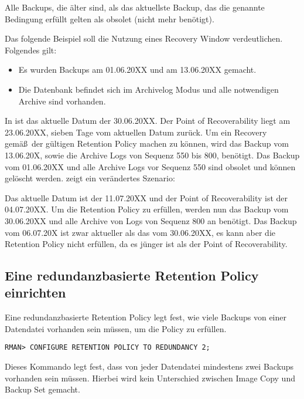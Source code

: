         Alle Backups, die älter sind, als das aktuellste Backup, das die genannte Bedingung erfüllt gelten als obsolet (nicht mehr benötigt).

        Das folgende Beispiel soll die Nutzung eines Recovery Window verdeutlichen. Folgendes gilt:
        \begin{itemize}
          \item Es wurden Backups am 01.06.20XX und am 13.06.20XX gemacht.
          \item Die Datenbank befindet sich im Archivelog Modus und alle notwendigen Archive sind vorhanden.
        \end{itemize}
        In  ist das aktuelle Datum der 30.06.20XX. Der Point of Recoverability liegt am 23.06.20XX, sieben Tage vom aktuellen Datum zurück. Um ein Recovery gemäß\ der gültigen Retention Policy machen zu können, wird das Backup vom 13.06.20X, sowie die Archive Logs von Sequenz 550 bis 800, benötigt. Das Backup vom 01.06.20XX und alle Archive Logs vor Sequenz 550 sind obsolet und können gelöscht werden.
\clearpage
         zeigt ein verändertes Szenario:


        Das aktuelle Datum ist der 11.07.20XX und der Point of Recoverability ist der 04.07.20XX. Um die Retention Policy zu erfüllen, werden nun das Backup vom 30.06.20XX und alle Archive von Logs von Sequenz 800 an benötigt. Das Backup vom 06.07.20X ist zwar aktueller als das vom 30.06.20XX, es kann aber die Retention Policy nicht erfüllen, da es jünger ist als der Point of Recoverability.
      \subsection{Eine redundanzbasierte Retention Policy einrichten}
        Eine redundanzbasierte Retention Policy legt fest, wie viele Backups von einer Datendatei vorhanden sein müssen, um die Policy zu erfüllen.
        \begin{lstlisting}[caption={REDUNDANCY setzen},label=admin1026,language=rman]
RMAN> CONFIGURE RETENTION POLICY TO REDUNDANCY 2;
        \end{lstlisting}
        Dieses Kommando legt fest, dass von jeder Datendatei mindestens zwei Backups vorhanden sein müssen. Hierbei wird kein Unterschied zwischen Image Copy und Backup Set gemacht.

